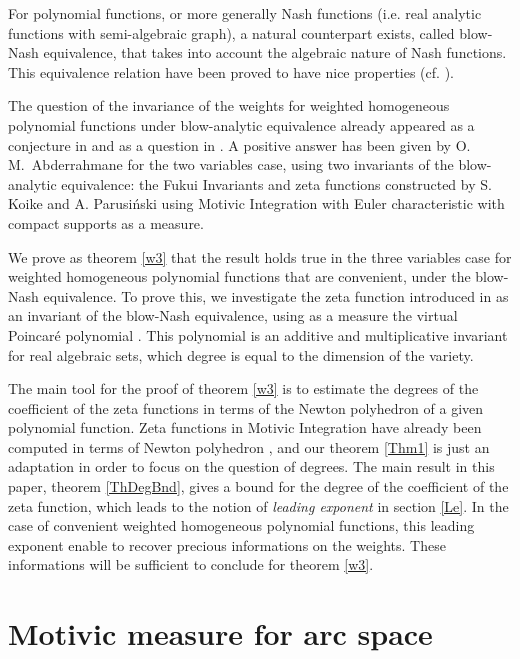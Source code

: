 \documentclass[12pt,a4paper,leqno]{amsart}
\theoremstyle{definition}
\begin{document}
For polynomial functions, or more generally Nash functions
(i.e. real analytic functions with semi-algebraic graph), a natural
counterpart exists, called blow-Nash equivalence, that takes into
account the algebraic nature of Nash functions. This equivalence
relation have been proved to have nice properties
(cf. \cite{FKK,Fichou,simple}). 

The question of the invariance of the weights for weighted homogeneous
polynomial functions under blow-analytic equivalence already appeared
as a conjecture in \cite{Fukui} and as a question in \cite{KP}. A
positive answer has been given by O. M.~Abderrahmane \cite{Ould} for the two
variables case, using two invariants of the blow-analytic equivalence:
the Fukui Invariants \cite{Fukui} and zeta functions \cite{KP}
constructed by S. Koike and A. Parusi\'nski using Motivic Integration \cite{DL} with Euler
characteristic with compact supports as a measure. 

We prove as theorem \ref{w3} that the result holds true
in the three variables case for weighted homogeneous polynomial
functions that are convenient, under the blow-Nash equivalence. To
prove this, we investigate the zeta function introduced in
\cite{Fichou} as an invariant of the blow-Nash equivalence, using as a measure the virtual Poincar\'e polynomial
\cite{MCP}. This polynomial is an additive and multiplicative
invariant for real algebraic sets, which degree is equal to the
dimension of the variety. 

The main tool for the proof of theorem
\ref{w3} is to estimate the degrees of the coefficient of the zeta
functions in terms of the Newton polyhedron of a given polynomial
function.
Zeta functions in Motivic Integration have already been computed in
terms of Newton polyhedron \cite{DK,DL-modif,Guibert}, and our theorem
\ref{Thm1} is just an adaptation in order to focus on the question of
degrees. The main result in this paper, theorem \ref{ThDegBnd}, gives a bound for the degree of the
coefficient of the zeta function, which leads to the notion of
\textit{leading exponent} in section \ref{Le}. In the case of
convenient weighted homogeneous polynomial functions, this leading
exponent enable to recover precious informations on the weights. These
informations will be sufficient to conclude for theorem \ref{w3}.

\section{Motivic measure for arc space}
\end{document}
